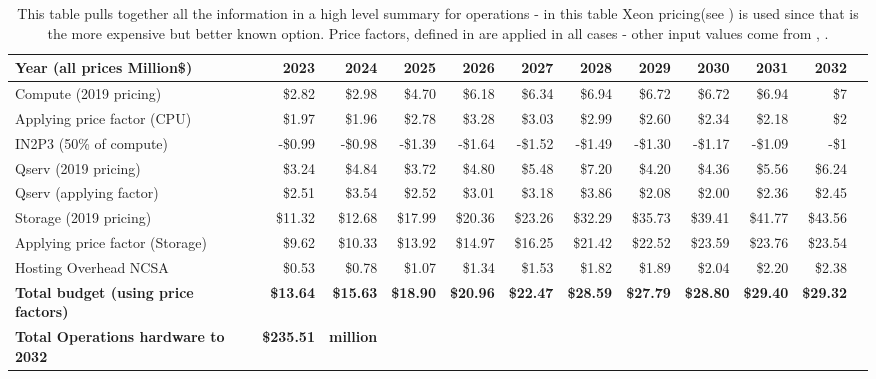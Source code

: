 \tiny \begin{longtable} { |p{}  |r  |r  |r  |r  |r  |r  |r  |r  |r  |r  |r |} 
\caption{This table pulls together all the information in a high level summary for operations - in this table Xeon pricing(see ) is used since that is the more expensive but better known option. Price factors, defined in  are applied in all cases - other input values come from , .
 \label{tab:opsSummary}}\\ 
\hline 
\textbf{Year  (all prices Million\$)}&\textbf{2023}&\textbf{2024}&\textbf{2025}&\textbf{2026}&\textbf{2027}&\textbf{2028}&\textbf{2029}&\textbf{2030}&\textbf{2031}&\textbf{2032} \\ \hline
{Compute (2019 pricing)}&{\$2.82}&{\$2.98}&{\$4.70}&{\$6.18}&{\$6.34}&{\$6.94}&{\$6.72}&{\$6.72}&{\$6.94}&{\$7} \\ \hline
{Applying price factor (CPU)}&{\$1.97}&{\$1.96}&{\$2.78}&{\$3.28}&{\$3.03}&{\$2.99}&{\$2.60}&{\$2.34}&{\$2.18}&{\$2} \\ \hline
{IN2P3 (50\% of compute)}&{-\$0.99}&{-\$0.98}&{-\$1.39}&{-\$1.64}&{-\$1.52}&{-\$1.49}&{-\$1.30}&{-\$1.17}&{-\$1.09}&{-\$1} \\ \hline
{Qserv (2019 pricing)}&{\$3.24}&{\$4.84}&{\$3.72}&{\$4.80}&{\$5.48}&{\$7.20}&{\$4.20}&{\$4.36}&{\$5.56}&{\$6.24} \\ \hline
{Qserv (applying factor)}&{\$2.51}&{\$3.54}&{\$2.52}&{\$3.01}&{\$3.18}&{\$3.86}&{\$2.08}&{\$2.00}&{\$2.36}&{\$2.45} \\ \hline
{Storage (2019 pricing)}&{\$11.32}&{\$12.68}&{\$17.99}&{\$20.36}&{\$23.26}&{\$32.29}&{\$35.73}&{\$39.41}&{\$41.77}&{\$43.56} \\ \hline
{Applying price factor (Storage)}&{\$9.62}&{\$10.33}&{\$13.92}&{\$14.97}&{\$16.25}&{\$21.42}&{\$22.52}&{\$23.59}&{\$23.76}&{\$23.54} \\ \hline
{Hosting Overhead NCSA
}&{\$0.53}&{\$0.78}&{\$1.07}&{\$1.34}&{\$1.53}&{\$1.82}&{\$1.89}&{\$2.04}&{\$2.20}&{\$2.38} \\ \hline
\textbf{Total budget (using price factors)}&\textbf{\$13.64}&\textbf{\$15.63}&\textbf{\$18.90}&\textbf{\$20.96}&\textbf{\$22.47}&\textbf{\$28.59}&\textbf{\$27.79}&\textbf{\$28.80}&\textbf{\$29.40}&\textbf{\$29.32} \\ \hline
\textbf{Total Operations hardware to 2032 }&\textbf{\$235.51}&\textbf{million}&&&&&&&& \\ \hline
\end{longtable} \normalsize
